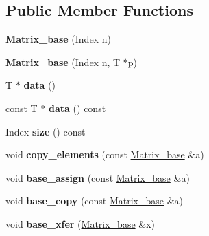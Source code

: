 \subsection*{Public Member Functions}
\begin{DoxyCompactItemize}
\item 
{\bfseries Matrix\+\_\+base} (Index n)\hypertarget{classcpt_1_1Matrix__base_a1dba8afb9fece940b053fc9af3f885dc}{}\label{classcpt_1_1Matrix__base_a1dba8afb9fece940b053fc9af3f885dc}

\item 
{\bfseries Matrix\+\_\+base} (Index n, T $\ast$p)\hypertarget{classcpt_1_1Matrix__base_ab7a0d319e4c828b8b6ea596a31648783}{}\label{classcpt_1_1Matrix__base_ab7a0d319e4c828b8b6ea596a31648783}

\item 
T $\ast$ {\bfseries data} ()\hypertarget{classcpt_1_1Matrix__base_a0888a3b1f2726bb34988ac39c46c6fec}{}\label{classcpt_1_1Matrix__base_a0888a3b1f2726bb34988ac39c46c6fec}

\item 
const T $\ast$ {\bfseries data} () const \hypertarget{classcpt_1_1Matrix__base_a574606a9e78eaac10d8a422e2084782d}{}\label{classcpt_1_1Matrix__base_a574606a9e78eaac10d8a422e2084782d}

\item 
Index {\bfseries size} () const \hypertarget{classcpt_1_1Matrix__base_aaae1836f8891228f86ee01269fb7a03a}{}\label{classcpt_1_1Matrix__base_aaae1836f8891228f86ee01269fb7a03a}

\item 
void {\bfseries copy\+\_\+elements} (const \hyperlink{classcpt_1_1Matrix__base}{Matrix\+\_\+base} \&a)\hypertarget{classcpt_1_1Matrix__base_aae30e210c82a1261158bf04bd8d48f88}{}\label{classcpt_1_1Matrix__base_aae30e210c82a1261158bf04bd8d48f88}

\item 
void {\bfseries base\+\_\+assign} (const \hyperlink{classcpt_1_1Matrix__base}{Matrix\+\_\+base} \&a)\hypertarget{classcpt_1_1Matrix__base_a6185e2356cf0480193bb7ff09ba16b76}{}\label{classcpt_1_1Matrix__base_a6185e2356cf0480193bb7ff09ba16b76}

\item 
void {\bfseries base\+\_\+copy} (const \hyperlink{classcpt_1_1Matrix__base}{Matrix\+\_\+base} \&a)\hypertarget{classcpt_1_1Matrix__base_a9e8898470c3a6d195d841c2170f061fc}{}\label{classcpt_1_1Matrix__base_a9e8898470c3a6d195d841c2170f061fc}

\item 
void {\bfseries base\+\_\+xfer} (\hyperlink{classcpt_1_1Matrix__base}{Matrix\+\_\+base} \&x)\hypertarget{classcpt_1_1Matrix__base_ae66ace5a673240d4fc46038ce0a695c9}{}\label{classcpt_1_1Matrix__base_ae66ace5a673240d4fc46038ce0a695c9}


\end{DoxyCompactItemize}
